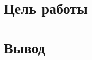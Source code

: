 





\tableofcontents
\listoffigures
\lstlistoflistings
\newpage

\section{Цель работы}

%





\section{Вывод}


